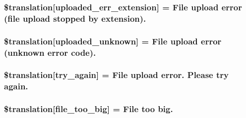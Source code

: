 \subsubsection[{\$translation}]{\setlength{\rightskip}{0pt plus 5cm}\$translation\mbox{[}\textquotesingle{}uploaded\+\_\+err\+\_\+extension\textquotesingle{}\mbox{]} = \textquotesingle{}File {\bf upload} error (file {\bf upload} stopped by extension).\textquotesingle{}}\label{class_8upload_8xx___x_x_8php_a01c69a4c8556602b3892dce727bace11}
\hypertarget{class_8upload_8xx___x_x_8php_a4a9168e922b827e6a28b5db1c00774ca}{}
\subsubsection[{\$translation}]{\setlength{\rightskip}{0pt plus 5cm}\$translation\mbox{[}\textquotesingle{}uploaded\+\_\+unknown\textquotesingle{}\mbox{]} = \textquotesingle{}File {\bf upload} error (unknown error code).\textquotesingle{}}\label{class_8upload_8xx___x_x_8php_a4a9168e922b827e6a28b5db1c00774ca}
\hypertarget{class_8upload_8xx___x_x_8php_a3afc377bd803683314f413a814243066}{}
\subsubsection[{\$translation}]{\setlength{\rightskip}{0pt plus 5cm}\$translation\mbox{[}\textquotesingle{}try\+\_\+again\textquotesingle{}\mbox{]} = \textquotesingle{}File {\bf upload} error. Please try again.\textquotesingle{}}\label{class_8upload_8xx___x_x_8php_a3afc377bd803683314f413a814243066}
\hypertarget{class_8upload_8xx___x_x_8php_a476278eb4a0c3df56af068e2d511a741}{}
\subsubsection[{\$translation}]{\setlength{\rightskip}{0pt plus 5cm}\$translation\mbox{[}\textquotesingle{}file\+\_\+too\+\_\+big\textquotesingle{}\mbox{]} = \textquotesingle{}File too big.\textquotesingle{}}\label{class_8upload_8xx___x_x_8php_a476278eb4a0c3df56af068e2d511a741}
\hypertarget{class_8upload_8xx___x_x_8php_a191a55df8e3bb7f3c51b70f3c1932e02}{}
